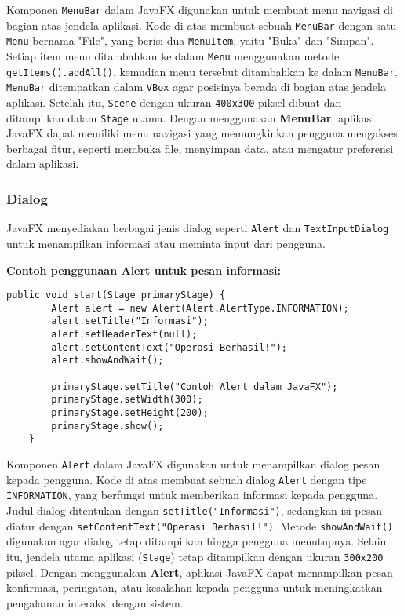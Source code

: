 Komponen \texttt{MenuBar} dalam JavaFX digunakan untuk membuat menu navigasi di bagian atas jendela aplikasi. Kode di atas membuat sebuah \texttt{MenuBar} dengan satu \texttt{Menu} bernama "File", yang berisi dua \texttt{MenuItem}, yaitu "Buka" dan "Simpan". Setiap item menu ditambahkan ke dalam \texttt{Menu} menggunakan metode \texttt{getItems().addAll()}, kemudian menu tersebut ditambahkan ke dalam \texttt{MenuBar}. \texttt{MenuBar} ditempatkan dalam \texttt{VBox} agar posisinya berada di bagian atas jendela aplikasi. Setelah itu, \texttt{Scene} dengan ukuran \texttt{400x300} piksel dibuat dan ditampilkan dalam \texttt{Stage} utama. Dengan menggunakan \textbf{MenuBar}, aplikasi JavaFX dapat memiliki menu navigasi yang memungkinkan pengguna mengakses berbagai fitur, seperti membuka file, menyimpan data, atau mengatur preferensi dalam aplikasi.



\subsubsection{Dialog}

JavaFX menyediakan berbagai jenis dialog seperti \texttt{Alert} dan \texttt{TextInputDialog} untuk menampilkan informasi atau meminta input dari pengguna.

\textbf{Contoh penggunaan Alert untuk pesan informasi:}
\begin{lstlisting}[style=JavaStyle, caption=Menampilkan Dialog Alert]
	public void start(Stage primaryStage) {
		Alert alert = new Alert(Alert.AlertType.INFORMATION);
		alert.setTitle("Informasi");
		alert.setHeaderText(null);
		alert.setContentText("Operasi Berhasil!");
		alert.showAndWait();
		
		primaryStage.setTitle("Contoh Alert dalam JavaFX");
		primaryStage.setWidth(300);
		primaryStage.setHeight(200);
		primaryStage.show();
	}
\end{lstlisting}

Komponen \texttt{Alert} dalam JavaFX digunakan untuk menampilkan dialog pesan kepada pengguna. Kode di atas membuat sebuah dialog \texttt{Alert} dengan tipe \texttt{INFORMATION}, yang berfungsi untuk memberikan informasi kepada pengguna. Judul dialog ditentukan dengan \texttt{setTitle("Informasi")}, sedangkan isi pesan diatur dengan \texttt{setContentText("Operasi Berhasil!")}. Metode \texttt{showAndWait()} digunakan agar dialog tetap ditampilkan hingga pengguna menutupnya. Selain itu, jendela utama aplikasi (\texttt{Stage}) tetap ditampilkan dengan ukuran \texttt{300x200} piksel. Dengan menggunakan \textbf{Alert}, aplikasi JavaFX dapat menampilkan pesan konfirmasi, peringatan, atau kesalahan kepada pengguna untuk meningkatkan pengalaman interaksi dengan sistem.



